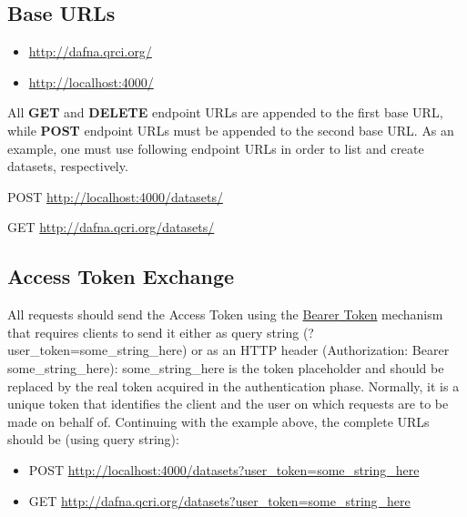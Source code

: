 \documentclass[a4paper,10pt]{scrartcl}
\begin{document}
\subsection{Base URLs}
\begin{itemize}
 \item \href{http://dafna.qrci.org/}{http://dafna.qrci.org/}
 \item \href{http://localhost:4000/}{http://localhost:4000/}
\end{itemize}
All \textbf{GET} and \textbf{DELETE} endpoint URLs are appended to the first base URL, while \textbf{POST} endpoint
URLs must be appended to the second base URL. As an example, one must use following endpoint URLs in order to 
list and create datasets, respectively. 
\begin{description}
 \item POST \href{http://localhost:4000/datasets/}{http://localhost:4000/datasets/} \\
 \item GET \href{http://dafna.qcri.org/datasets/}{http://dafna.qcri.org/datasets/} 
\end{description}

\subsection{Access Token Exchange}
All requests should send the Access Token using the \href{http://oauth2.thephpleague.com/token-types/}{Bearer Token}
mechanism that requires clients to send it either as query string (?user\_token=some\_string\_here)
or as an HTTP header (Authorization: Bearer some\_string\_here): some\_string\_here is the
token placeholder and should be replaced by the real token acquired in the authentication phase.
Normally, it is a unique token that identifies the client and the user on which
requests are to be made on behalf of. Continuing with the example above, the complete
URLs should be (using query string): 
\begin{itemize}
 \item POST \href{http://localhost:4000/datasets?user\_token=some\_string\_here}{http://localhost:4000/datasets?user\_token=some\_string\_here} \\
  \item GET \href{http://dafna.qcri.org/datasets?user\_token=some\_string\_here}{http://dafna.qcri.org/datasets?user\_token=some\_string\_here} 
\end{itemize}
\end{document}
